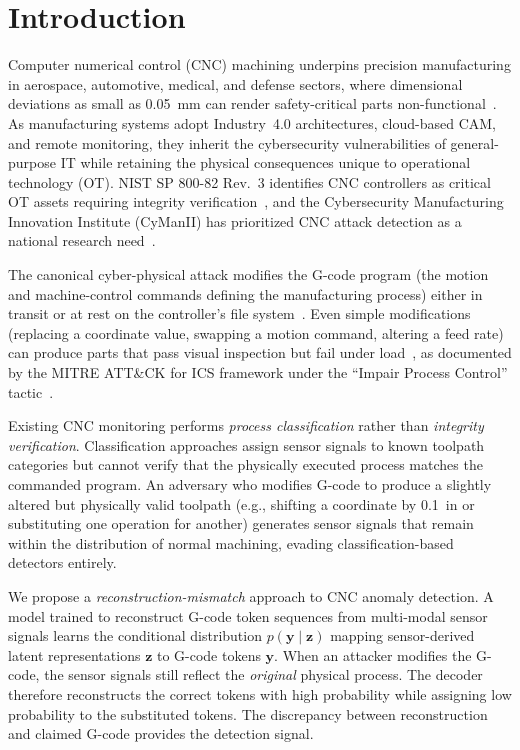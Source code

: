 \section{Introduction}
\label{sec:introduction}

Computer numerical control (CNC) machining underpins precision manufacturing in aerospace, automotive, medical, and defense sectors, where dimensional deviations as small as 0.05~mm can render safety-critical parts non-functional~\cite{nist2023,graves2023cyberphysical}.
As manufacturing systems adopt Industry~4.0 architectures, cloud-based CAM, and remote monitoring, they inherit the cybersecurity vulnerabilities of general-purpose IT while retaining the physical consequences unique to operational technology (OT).
NIST SP 800-82 Rev.~3 identifies CNC controllers as critical OT assets requiring integrity verification~\cite{nist2023}, and the Cybersecurity Manufacturing Innovation Institute (CyManII) has prioritized CNC attack detection as a national research need~\cite{cymanii2022}.

The canonical cyber-physical attack modifies the G-code program (the motion and machine-control commands defining the manufacturing process) either in transit or at rest on the controller's file system~\cite{yampolskiy2018security,belikovetsky2017dr0wned}.
Even simple modifications (replacing a coordinate value, swapping a motion command, altering a feed rate) can produce parts that pass visual inspection but fail under load~\cite{belikovetsky2017dr0wned,zeltmann2016manufacturing}, as documented by the MITRE ATT\&CK for ICS framework under the ``Impair Process Control'' tactic~\cite{mitre2021attack}.

Existing CNC monitoring performs \emph{process classification} rather than \emph{integrity verification}.
Classification approaches assign sensor signals to known toolpath categories but cannot verify that the physically executed process matches the commanded program.
An adversary who modifies G-code to produce a slightly altered but physically valid toolpath (e.g., shifting a coordinate by 0.1~in or substituting one operation for another) generates sensor signals that remain within the distribution of normal machining, evading classification-based detectors entirely.

We propose a \emph{reconstruction-mismatch} approach to CNC anomaly detection.
A model trained to reconstruct G-code token sequences from multi-modal sensor signals learns the conditional distribution $p(\mathbf{y} \mid \mathbf{z})$ mapping sensor-derived latent representations $\mathbf{z}$ to G-code tokens $\mathbf{y}$.
When an attacker modifies the G-code, the sensor signals still reflect the \emph{original} physical process.
The decoder therefore reconstructs the correct tokens with high probability while assigning low probability to the substituted tokens.
The discrepancy between reconstruction and claimed G-code provides the detection signal.

